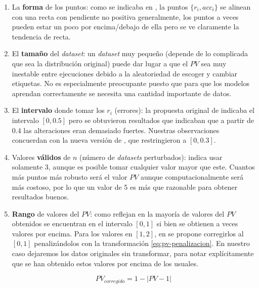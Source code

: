 \begin{enumerate}
  \item La \textbf{forma} de los puntos: como se indicaba en \cite{zhang2019perturbation}, la puntos $\{r_i, acc_i\}$ se alinean con una recta con pendiente no positiva generalmente, los puntos a veces pueden estar un poco por encima/debajo de ella pero se ve claramente la tendencia de recta.

  \item El \textbf{tamaño} del \emph{dataset}: un \emph{dataset} muy pequeño (depende de lo complicada que sea la distribución original) puede dar lugar a que el $PV$ sea muy inestable entre ejecuciones debido a la aleatoriedad de escoger y cambiar etiquetas. No es especialmente preocupante puesto que para que los modelos aprendan correctamente se necesita una cantidad importante de datos.

  \item El \textbf{intervalo} donde tomar los $r_i$ (errores): la propuesta original de \cite{zhang2019perturbation} indicaba el intervalo $[0, 0.5]$ pero se obtuvieron resultados que indicaban que a partir de $0.4$ las alteraciones eran demasiado fuertes. Nuestras observaciones concuerdan con la nueva versión de \cite{zhang2019perturbation}, que restringieron a $[0, 0.3]$.

  \item Valores \textbf{válidos} de $n$ (número de \emph{datasets} perturbados): \cite{zhang2019perturbation} indica usar solamente 3, aunque es posible tomar cualquier valor mayor que este. Cuantos más puntos más robusto será el valor $PV$ aunque computacionalmente será más costoso, por lo que un valor de 5 es más que razonable para obtener resultados buenos.

  \item \textbf{Rango} de valores del $PV$: como reflejan en \cite{zhang2019perturbation} la mayoría de valores del $PV$ obtenidos se encuentran en el intervalo $[0, 1]$ si bien se obtienen a veces valores por encima. Para los valores en $[1, 2]$, en \cite{zhang2019perturbation} se propone corregirlos al $[0, 1]$ penalizándolos con la   transformación \eqref{eq:pv-penalizacion}. En nuestro caso dejaremos los datos originales sin transformar, para notar explícitamente que se han obtenido estos valores por encima de los usuales.

  \begin{equation}
    PV_{corregido} = 1 - |PV - 1|
    \label{eq:pv-penalizacion}
  \end{equation}


\end{enumerate}
